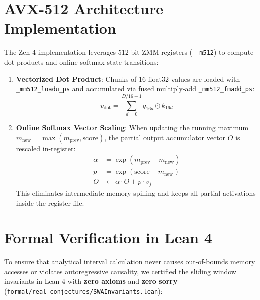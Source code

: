 \documentclass[10pt,twocolumn,letterpaper]{article}
\begin{document}
\section{AVX-512 Architecture Implementation}

The Zen 4 implementation leverages 512-bit ZMM registers (\texttt{\_\_m512}) to compute dot products and online softmax state transitions:

\begin{enumerate}
    \item \textbf{Vectorized Dot Product}:
    Chunks of 16 float32 values are loaded with \texttt{\_mm512\_loadu\_ps} and accumulated via fused multiply-add \texttt{\_mm512\_fmadd\_ps}:
    \begin{equation}
    v_{\text{dot}} = \sum_{d=0}^{D/16 - 1} q_{16d} \odot k_{16d}
    \end{equation}
    
    \item \textbf{Online Softmax Vector Scaling}:
    When updating the running maximum $m_{\text{new}} = \max(m_{\text{prev}}, \text{score})$, the partial output accumulator vector $O$ is rescaled in-register:
    \begin{align}
    \alpha &= \exp(m_{\text{prev}} - m_{\text{new}}) \\
    p &= \exp(\text{score} - m_{\text{new}}) \\
    O &\leftarrow \alpha \cdot O + p \cdot v_j
    \end{align}
    This eliminates intermediate memory spilling and keeps all partial activations inside the register file.
\end{enumerate}

\section{Formal Verification in Lean 4}

To ensure that analytical interval calculation never causes out-of-bounds memory accesses or violates autoregressive causality, we certified the sliding window invariants in Lean 4 with \textbf{zero axioms} and \textbf{zero sorry} (\texttt{formal/real\_conjectures/SWAInvariants.lean}):
\end{document}
